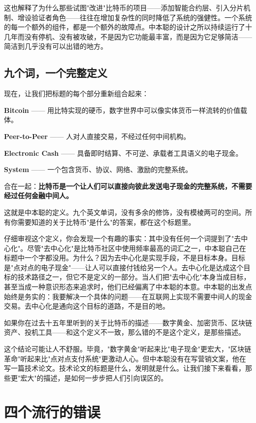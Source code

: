 \documentclass[a4paper,12pt,openany]{ctexbook}
\begin{document}
这也解释了为什么那些试图"改进"比特币的项目——添加智能合约层、引入分片机制、增设验证者角色——往往在增加复杂性的同时降低了系统的强健性。一个系统的每一个额外的组件，都是一个额外的故障点。中本聪的设计之所以持续运行了十几年而没有停机、没有被攻破，不是因为它功能最丰富，而是因为它足够简洁——简洁到几乎没有可以出错的地方。


\subsection*{九个词，一个完整定义}


现在，让我们把标题的每个部分重新组合起来：

\textbf{Bitcoin} —— 用比特实现的硬币，数字世界中可以像实体货币一样流转的价值载体。

\textbf{Peer-to-Peer} —— 人对人直接交易，不经过任何中间机构。

\textbf{Electronic Cash} —— 具备即时结算、不可逆、承载者工具语义的电子现金。

\textbf{System} —— 一个包含货币、协议、网络、激励的完整系统。

合在一起：\textbf{比特币是一个让人们可以直接向彼此发送电子现金的完整系统，不需要经过任何金融中间人。}

这就是中本聪的定义。九个英文单词，没有多余的修饰，没有模棱两可的空间。所有你需要知道的关于比特币"是什么"的答案，都在这个标题里。

仔细审视这个定义，你会发现一个有趣的事实：其中没有任何一个词提到了"去中心化"。尽管"去中心化"是比特币社区中使用频率最高的词汇之一，中本聪自己在标题中一个字都没用。为什么？因为去中心化是实现手段，不是目标本身。目标是"点对点的电子现金"——让人可以直接付钱给另一个人。去中心化是达成这个目标的技术路径之一，但它不是定义的一部分。当人们把"去中心化"本身当成目标，甚至当成一种意识形态来追求时，他们已经偏离了中本聪的本意。中本聪的出发点始终是务实的：我要解决一个具体的问题——在互联网上实现不需要中间人的现金交易。去中心化是通向这个目标的道路，不是目的地。

如果你在过去十五年里听到的关于比特币的描述——数字黄金、加密货币、区块链资产、投机工具——和这个定义不一致，那么错的不是这个定义，是那些描述。

这个结论可能让人不舒服。毕竟，"数字黄金"听起来比"电子现金"更宏大，"区块链革命"听起来比"点对点支付系统"更激动人心。但中本聪没有在写营销文案，他在写一篇技术论文。技术论文的标题是什么，发明就是什么。让我们接下来看看，那些更"宏大"的描述，是如何一步步把人们引向误区的。


\section*{四个流行的错误}
\end{document}
